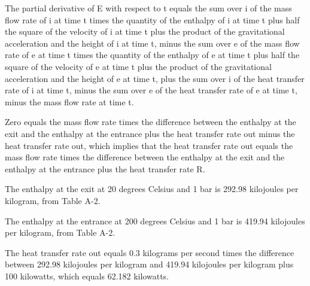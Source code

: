 The partial derivative of E with respect to t equals the sum over i of the mass flow rate of i at time t times the quantity of the enthalpy of i at time t plus half the square of the velocity of i at time t plus the product of the gravitational acceleration and the height of i at time t, minus the sum over e of the mass flow rate of e at time t times the quantity of the enthalpy of e at time t plus half the square of the velocity of e at time t plus the product of the gravitational acceleration and the height of e at time t, plus the sum over i of the heat transfer rate of i at time t, minus the sum over e of the heat transfer rate of e at time t, minus the mass flow rate at time t.

Zero equals the mass flow rate times the difference between the enthalpy at the exit and the enthalpy at the entrance plus the heat transfer rate out minus the heat transfer rate out, which implies that the heat transfer rate out equals the mass flow rate times the difference between the enthalpy at the exit and the enthalpy at the entrance plus the heat transfer rate R.

The enthalpy at the exit at 20 degrees Celsius and 1 bar is 292.98 kilojoules per kilogram, from Table A-2.

The enthalpy at the entrance at 200 degrees Celsius and 1 bar is 419.94 kilojoules per kilogram, from Table A-2.

The heat transfer rate out equals 0.3 kilograms per second times the difference between 292.98 kilojoules per kilogram and 419.94 kilojoules per kilogram plus 100 kilowatts, which equals 62.182 kilowatts.